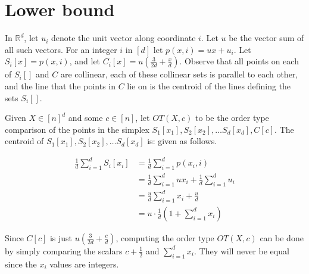 \documentclass[leqno,12pt]{article}
\begin{document}
\iffalse
\section{Lower bound}\label{sec:lower-bound}
In $\mathbb{R}^d$, let $u_i$ denote the unit vector along coordinate $i$. 
Let $u$ be the vector sum of all such vectors. 
For an integer $i$ in 
 $[d]$ let $p(x,i)=ux+u_i$.
Let $S_i[x] = p(x,i)$, and
let $C_i[x] = u\left(\frac{3}{2d}+\frac{x}{d}\right)$.
Observe that all points on each of $S_i[]$ and $C$ are collinear, each of these collinear sets is parallel to each other, and the line that the points in $C$ lie on is the centroid of the lines defining the sets $S_i[]$.

Given $X \in [n]^d$ and some  $c\in [n]$, let $OT(X,c)$ to be the order type comparison of the points in the simplex $S_1[x_1], S_2[x_2], \ldots S_d[x_d], C[c]$. 
The centroid of $S_1[x_1], S_2[x_2], \ldots S_d[x_d]$ is:
 given as follows.

\begin{align*}
\frac{1}{d} \sum_{i=1}^d S_i[x_i] &=
\frac{1}{d} \sum_{i=1}^d p(x_i,i) \\
&= \frac{1}{d} \sum_{i=1}^d ux_i +\frac{1}{d}\sum_{i=1}^d u_i\\
&=\frac{u}{d} \sum_{i=1}^d x_i + \frac{u}{d}\\
&=u \cdot \frac{1}{d} \left( 1+ \sum_{i=1}^d x_i \right)
\end{align*}

\noindent Since $C[c]$ is just $u \left( \frac{3}{2d}+ \frac{c}{d} \right)$, computing the order type $OT(X,c)$ can be done by simply comparing the scalars $c{+}\frac{1}{2}$ and
$\sum_{i=1}^d x_i $. They will never be equal since the $x_i$ values are integers.
\end{document}
